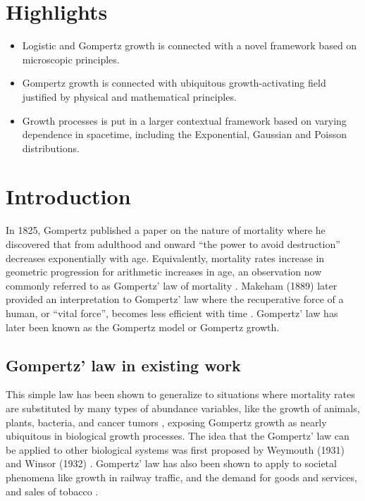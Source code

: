 \documentclass{article}
\begin{document}
\section*{Highlights}
\begin{itemize}
\item Logistic and Gompertz growth is connected with a novel framework based on microscopic principles.
\item Gompertz growth is connected with ubiquitous growth-activating field justified by physical and mathematical principles.
\item Growth processes is put in a larger contextual framework based on varying dependence in spacetime, including the Exponential, Gaussian and Poisson distributions. 
\end{itemize}

\section{Introduction}

In 1825, Gompertz published a paper on the nature of mortality where he discovered that from adulthood and onward ``the power to avoid destruction'' decreases exponentially with age. Equivalently, mortality rates increase in geometric progression for arithmetic increases in age, an observation now commonly referred to as Gompertz' law of mortality \cite{Gompertz1825}. Makeham (1889) later provided an interpretation to Gompertz' law where the recuperative force of a human, or ``vital force'', becomes less efficient with time \cite{makeham1889further}. Gompertz' law has later been known as the Gompertz model or Gompertz growth. 

\subsection{Gompertz' law in existing work}
This simple law has been shown to generalize to situations where mortality rates are substituted by many types of abundance variables, like the growth of animals, plants, bacteria, and cancer tumors \cite{weymouth1931relative,weymouth1931age,laird1964dynamics,zwietering1990modeling,skinner1994mathematical,starck1998avian,aggrey2002comparison,paine2012fit,benzekry2014classical,halmi2014evaluation,tjorve2010shapes}, exposing Gompertz growth as nearly ubiquitous in biological growth processes. The idea that the Gompertz' law can be applied to other biological systems was first proposed by Weymouth (1931) \cite{weymouth1931relative,weymouth1931age} and Winsor (1932) \cite{Winsor1932}. Gompertz' law has also been shown to apply to societal phenomena like growth in railway traffic, and the demand for goods and services, and sales of tobacco \cite{olshansky1997ever,prescott1922law,peabody1924growth}.
\end{document}
